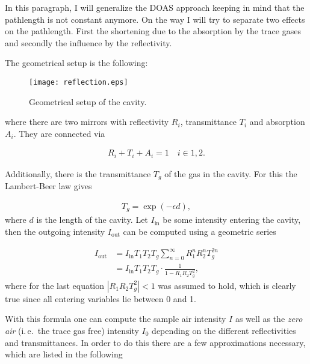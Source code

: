 In this paragraph, I will generalize the DOAS approach keeping in mind
that the pathlength is not constant anymore. On the way I will try to
separate two effects on the pathlength. First the shortening due to
the absorption by the trace gases and secondly the influence by the
reflectivity.

The geometrical setup is the following:

\begin{figure}[htbp]
  \centering
  \texttt{[image: reflection.eps]}
  \caption{Geometrical setup of the cavity.}
  \label{fig:cavity}
\end{figure}
where there are two mirrors with reflectivity $R_i$, transmittance $T_i$
and absorption $A_i$. They are connected via

\begin{align*}
  R_i + T_i + A_i = 1 \quad i \in{1,2}.
\end{align*}

Additionally, there is the transmittance $T_g$ of the gas in the
cavity. For this the Lambert-Beer law gives

\begin{align*}
  T_g = \exp(-\epsilon d),
\end{align*}
where $d$ is the length of the cavity. Let $I_{\text{in}}$ be some
intensity entering the cavity, then the outgoing intensity
$I_{\text{out}}$ can be computed using a geometric series

\begin{align}
  I_{\text{out}} & = I_{\text{in}} T_1 T_2 T_g \sum_{n=0}^\infty R_1^n R_2^n T_g^{2n}\nonumber\\
  & = I_{\text{in}} T_1 T_2 T_g \cdot \frac{1}{1 - R_1R_2T_g^2},\label{eq:geometric}
\end{align}
where for the last equation $|R_1R_2T_g^2| < 1$ was assumed to hold,
which is clearly true since all entering variables lie between 0 and
1.

With this formula one can compute the sample air intensity $I$
as well as the \emph{zero air} (i.\,e.\ the trace gas free) intensity $I_0$
depending on the different reflectivities and transmittances. In order to do
this there are a few approximations necessary, which are listed in the
following


